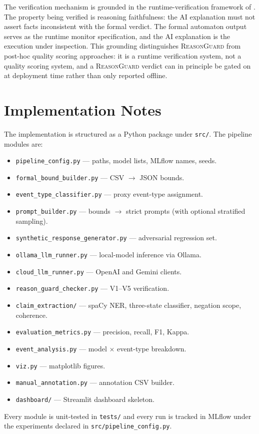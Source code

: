 The verification mechanism is grounded in the runtime-verification
framework of \autocite{LeuckerSchallhart2009RuntimeVerification}. The
property being verified is reasoning faithfulness: the AI explanation must
not assert facts inconsistent with the formal verdict. The formal automaton
output serves as the runtime monitor specification, and the AI explanation
is the execution under inspection. This grounding distinguishes
\textsc{ReasonGuard} from post-hoc quality scoring approaches: it is a
runtime verification system, not a quality scoring system, and a
\textsc{ReasonGuard} verdict can in principle be gated on at deployment
time rather than only reported offline.

\section{Implementation Notes}
\label{sec:implementation-notes}

The implementation is structured as a Python package under \texttt{src/}.
The pipeline modules are:

\begin{itemize}
  \item \texttt{pipeline\_config.py} — paths, model lists, MLflow names,
        seeds.
  \item \texttt{formal\_bound\_builder.py} — CSV $\to$ JSON bounds.
  \item \texttt{event\_type\_classifier.py} — proxy event-type assignment.
  \item \texttt{prompt\_builder.py} — bounds $\to$ strict prompts (with
        optional stratified sampling).
  \item \texttt{synthetic\_response\_generator.py} — adversarial
        regression set.
  \item \texttt{ollama\_llm\_runner.py} — local-model inference via Ollama.
  \item \texttt{cloud\_llm\_runner.py} — OpenAI and Gemini clients.
  \item \texttt{reason\_guard\_checker.py} — V1--V5 verification.
  \item \texttt{claim\_extraction/} — spaCy NER, three-state classifier,
        negation scope, coherence.
  \item \texttt{evaluation\_metrics.py} — precision, recall, F1, Kappa.
  \item \texttt{event\_analysis.py} — model $\times$ event-type breakdown.
  \item \texttt{viz.py} — matplotlib figures.
  \item \texttt{manual\_annotation.py} — annotation CSV builder.
  \item \texttt{dashboard/} — Streamlit dashboard skeleton.
\end{itemize}

Every module is unit-tested in \texttt{tests/} and every run is tracked in
MLflow under the experiments declared in
\texttt{src/pipeline\_config.py}.
